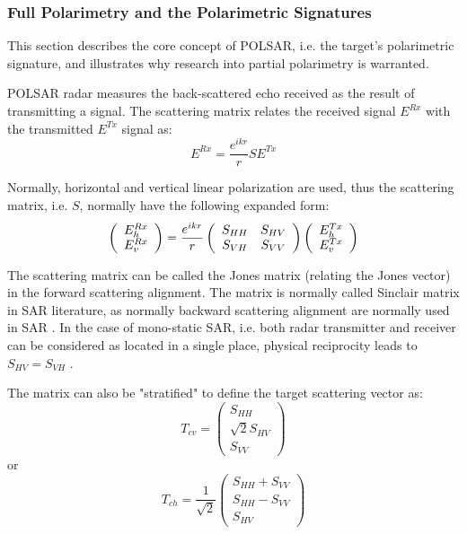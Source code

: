 \subsubsection{Full Polarimetry and the Polarimetric Signatures}

This section describes the core concept of POLSAR, i.e. the target's polarimetric signature, 
	and illustrates why research into partial polarimetry is warranted.

POLSAR radar measures the back-scattered echo received as the result of transmitting a signal.
The scattering matrix relates the received signal $E^{Rx}$ with the transmitted $E^{Tx}$ signal as:
\begin{equation}
 E^{Rx} = \frac{e^{ikr}}{r} S E^{Tx}
\end{equation}

Normally, horizontal and vertical linear polarization are used, thus the scattering matrix, i.e. $S$, normally have the following expanded form:
\begin{equation}
 \left( 
\begin{array}{c}
 E_h^{Rx} \\
 E_v^{Rx}
\end{array}
 \right) = \frac{e^{ikr}}{r} 
\left( 
\begin{array}{c c}
 S_{HH} & S_{HV} \\
 S_{VH} & S_{VV}
\end{array}
 \right) 
\left( 
\begin{array}{c}
 E_h^{Tx} \\
 E_v^{Tx}
\end{array}
 \right) 
\end{equation}

The scattering matrix can be called the Jones matrix (relating the Jones vector) in the forward scattering alignment.
The matrix is normally called Sinclair matrix in SAR literature, as normally backward scattering alignment are normally used in SAR \cite{Sinclair_1950_ProcsIRE}.
In the case of mono-static SAR, i.e. both radar transmitter and receiver can be considered as located in a single place, physical reciprocity leads to $S_{HV}=S_{VH}$ \cite{Nghiem_1992_RadioSci}.

The matrix can also be "stratified" to define the target scattering vector as: 
\begin{equation}
T_{cv} = \left( 
\begin{array}{c}
 S_{HH} \\
 \sqrt{2} S_{HV} \\
 S_{VV}
\end{array}
 \right) 
\end{equation}
or 
\begin{equation}
T_{ch} = \frac{1}{\sqrt{2}} \left( 
\begin{array}{c}
 S_{HH} + S_{VV}\\
 S_{HH} - S_{VV} \\
 S_{HV}
\end{array}
 \right) 
\end{equation}

